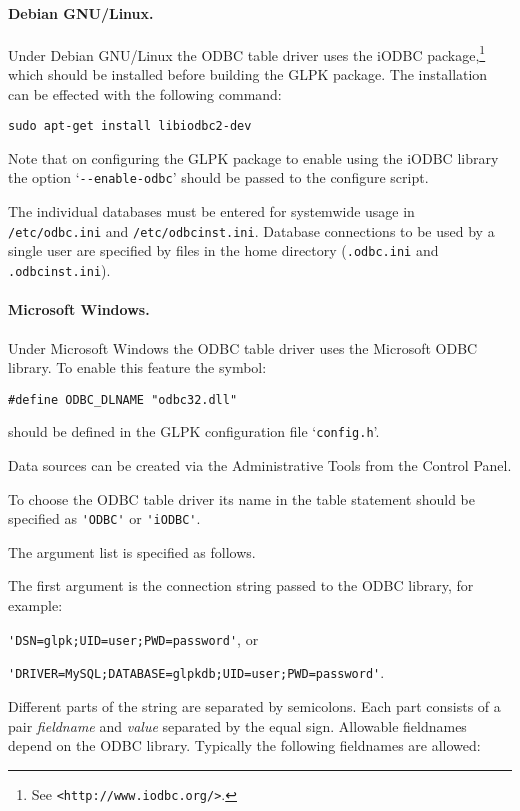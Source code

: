 \documentclass[11pt,draft]{article}
\begin{document}
\paragraph{Debian GNU/Linux.}
Under Debian GNU/Linux the ODBC table driver uses the iODBC
package,\footnote{See {\tt<http://www.iodbc.org/>}.} which should be
installed before building the GLPK package. The installation can be
effected with the following command:

\begin{verbatim}
sudo apt-get install libiodbc2-dev
\end{verbatim}

Note that on configuring the GLPK package to enable using the iODBC
library the option `\verb|--enable-odbc|' should be passed to the
configure script.

The individual databases must be entered for systemwide usage in
\linebreak \verb|/etc/odbc.ini| and \verb|/etc/odbcinst.ini|. Database
connections to be used by a single user are specified by files in the
home directory (\verb|.odbc.ini| and \verb|.odbcinst.ini|).

\paragraph{Microsoft Windows.}
Under Microsoft Windows the ODBC table driver uses the Microsoft ODBC
library. To enable this feature the symbol:

\begin{verbatim}
#define ODBC_DLNAME "odbc32.dll"
\end{verbatim}

\noindent
should be defined in the GLPK configuration file `\verb|config.h|'.

Data sources can be created via the Administrative Tools from the
Control Panel.

\bigskip

To choose the ODBC table driver its name in the table statement should
be specified as \verb|'ODBC'| or \verb|'iODBC'|.

The argument list is specified as follows.

The first argument is the connection string passed to the ODBC library,
for example:

\verb|'DSN=glpk;UID=user;PWD=password'|, or

\verb|'DRIVER=MySQL;DATABASE=glpkdb;UID=user;PWD=password'|.

Different parts of the string are separated by semicolons. Each part
consists of a pair {\it fieldname} and {\it value} separated by the
equal sign. Allowable fieldnames depend on the ODBC library. Typically
the following fieldnames are allowed:
\end{document}
